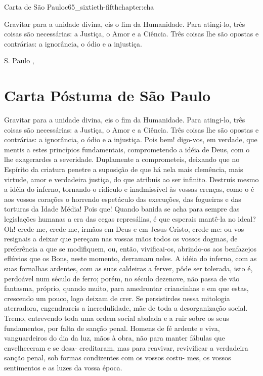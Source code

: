 \begin{chapterpage}{Carta de São Paulo}{c65_sixtieth-fifthchapter:cha}
 
\begin{myquotation} Gravitar para a unidade divina, eis o fim da Humanidade. Para atingi-lo, três coisas são necessárias: a Justiça, o Amor e a Ciência. Três coisas lhe são opostas e contrárias: a ignorância, o ódio e a injustiça. 
\par\vspace*{15mm}
\mbox{}\hfill \emdash{}S. Paulo
, %
\par\end{myquotation}

\end{chapterpage}



\section{Carta Póstuma de São Paulo}\label{c1_basicformatting:sec}

\emdash{}Gravitar para a unidade divina, eis o fim da Humanidade. Para atingi-lo, três coisas são necessárias: a Justiça,
o Amor e a Ciência. Três coisas lhe são opostas e contrárias: a ignorância, o ódio e a injustiça. Pois bem! digo-vos,
em verdade, que mentis a estes princípios fundamentais,
comprometendo a idéia de Deus, com o lhe exagerardes a
severidade. Duplamente a comprometeis, deixando que no
Espírito da criatura penetre a suposição de que há nela
mais clemência, mais virtude, amor e verdadeira justiça,
do que atribuís ao ser infinito. Destruís mesmo a idéia do
inferno, tornando-o ridículo e inadmissível às vossas crenças, como o é aos vossos corações o horrendo espetáculo
das execuções, das fogueiras e das torturas da Idade Média! Pois que! Quando banida se acha para sempre das legislações humanas a era das cegas represálias, é que
esperais mantê-la no ideal? Oh! crede-me, crede-me, irmãos
em Deus e em Jesus-Cristo, crede-me: ou vos resignais a
deixar que pereçam nas vossas mãos todos os vossos
dogmas, de preferência a que se modifiquem, ou, então,
vivificai-os, abrindo-os aos benfazejos eflúvios que os Bons,
neste momento, derramam neles. A idéia do inferno, com
as suas fornalhas ardentes, com as suas caldeiras a ferver,
pôde ser tolerada, isto é, perdoável num século de ferro;
porém, no século dezenove, não passa de vão fantasma,
próprio, quando muito, para amedrontar criancinhas e em que estas, crescendo um pouco, logo deixam de crer. Se
persistirdes nessa mitologia aterradora, engendrareis a incredulidade, mãe de toda a desorganização social. Tremo,
entrevendo toda uma ordem social abalada e a ruir sobre
os seus fundamentos, por falta de sanção penal. Homens
de fé ardente e viva, vanguardeiros do dia da luz, mãos à
obra, não para manter fábulas que envelheceram e se desa-
creditaram, mas para reavivar, revivificar a verdadeira sanção penal, sob formas condizentes com os vossos costu-
mes, os vossos sentimentos e as luzes da vossa época.

